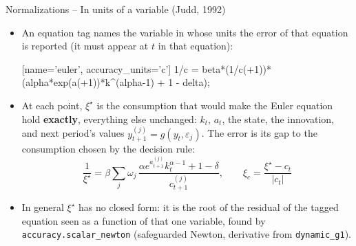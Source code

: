 \documentclass[11pt,aspectratio=169]{beamer}
\newcommand{\code}[1]{\texttt{#1}}
\begin{document}
\begin{frame}[fragile]{Normalizations -- In units of a variable (Judd, 1992)}

\begin{itemize}

\item An equation tag names the variable in whose units the error of that equation is reported (it must appear at $t$ in that equation):
\begin{semiverbatim}\footnotesize
[name='euler', accuracy_units='c']
1/c = beta*(1/c(+1))*(alpha*exp(a(+1))*k^(alpha-1) + 1 - delta);
\end{semiverbatim}

\item At each point, $\xi^\star$ is the consumption that would make the Euler equation hold \textbf{exactly}, everything else unchanged: $k_t$, $a_t$, the state, the innovation, and next period's values $y^{(j)}_{t+1}=g(y_t,\varepsilon_j)$. The error is its gap to the consumption chosen by the decision rule:
  \[
  \frac{1}{\xi^\star} = \beta\sum_j \omega_j\,\frac{\alpha e^{a^{(j)}_{t+1}}k_t^{\alpha-1}+1-\delta}{c^{(j)}_{t+1}},\qquad
  \boxed{\xi_c = \frac{\xi^\star - c_t}{|c_t|}}
  \]

\item In general $\xi^\star$ has no closed form: it is the root of the residual of the tagged equation seen as a function of that one variable, found by \code{accuracy.scalar\_newton} (safeguarded Newton, derivative from \code{dynamic\_g1}).

\end{itemize}

\end{frame}
\end{document}
